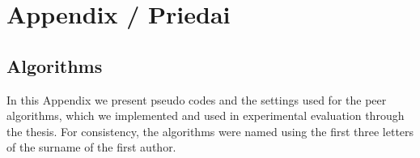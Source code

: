 \renewcommand{\thesection}{\alph{section}}
	
\chapter*{Appendix / Priedai}
\label{cha:appendixA}



\renewcommand{\thefigure}{A.\arabic{figure}}   
\setcounter{figure}{0}
\renewcommand{\thetable}{A.\arabic{table}}
\setcounter{table}{0}

\section{Algorithms}

In this Appendix we present pseudo codes and the settings used for the peer algorithms, which we implemented and used in experimental evaluation through the thesis. For consistency, the algorithms were named using the first three letters of the surname of the first author.
